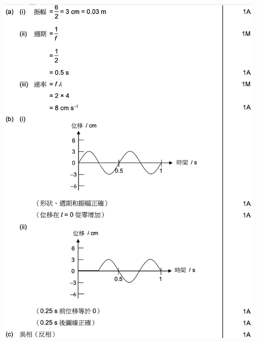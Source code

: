 {
}{
    {\par\centering\includegraphics[width=\textwidth]{./img/ch1_earlyclass_wave_lq_2024-05-13-13-13-55.png}\par}
}

